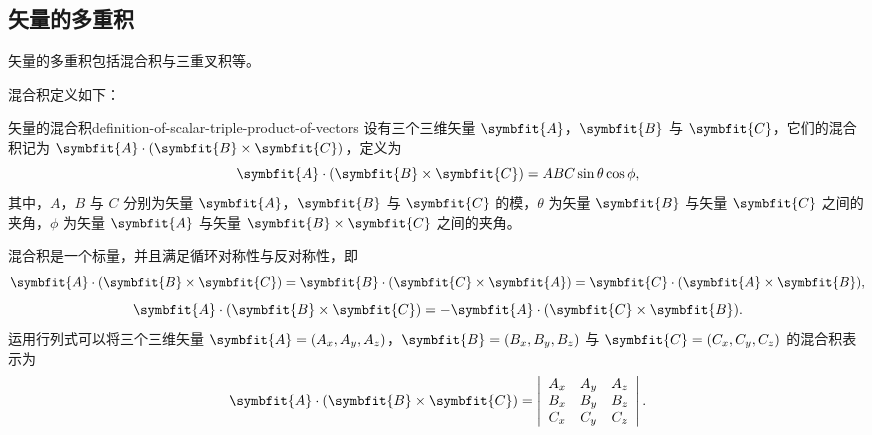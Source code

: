\subsection{矢量的多重积}\label{subsec:multiple-product-of-vectors}

矢量的多重积包括混合积与三重叉积等。

混合积定义如下：
\begin{definition}{矢量的混合积}{definition-of-scalar-triple-product-of-vectors}
    设有三个三维矢量 $ \symbfit{A} $，$ \symbfit{B} $ 与 $ \symbfit{C} $，它们的混合积记为 $ \symbfit{A} \cdot (\symbfit{B} \times \symbfit{C}) $，定义为
    \begin{equation}
        \symbfit{A} \cdot (\symbfit{B} \times \symbfit{C}) = ABC \sin \theta \cos \phi ,
    \end{equation}
    其中，$ A $，$ B $ 与 $ C $ 分别为矢量 $ \symbfit{A} $，$ \symbfit{B} $ 与 $ \symbfit{C} $ 的模，$ \theta $ 为矢量 $ \symbfit{B} $ 与矢量 $ \symbfit{C} $ 之间的夹角，$ \phi $ 为矢量 $ \symbfit{A} $ 与矢量 $ \symbfit{B} \times \symbfit{C} $ 之间的夹角。
\end{definition}
混合积是一个标量，并且满足循环对称性与反对称性，即
\begin{equation}
    \symbfit{A} \cdot (\symbfit{B} \times \symbfit{C}) = \symbfit{B} \cdot (\symbfit{C} \times \symbfit{A}) = \symbfit{C} \cdot (\symbfit{A} \times \symbfit{B}) ,
\end{equation}
\begin{equation}
    \symbfit{A} \cdot (\symbfit{B} \times \symbfit{C}) = - \symbfit{A} \cdot (\symbfit{C} \times \symbfit{B}) .
\end{equation}
运用行列式可以将三个三维矢量 $ \symbfit{A} = (A_x , A_y , A_z) $，$ \symbfit{B} = (B_x , B_y , B_z) $ 与 $ \symbfit{C} = (C_x , C_y , C_z) $ 的混合积表示为
\begin{equation}
    \symbfit{A} \cdot (\symbfit{B} \times \symbfit{C}) = \left| \begin{array}{ccc}
        A_x & A_y & A_z \\
        B_x & B_y & B_z \\
        C_x & C_y & C_z
    \end{array} \right| .
\end{equation}

